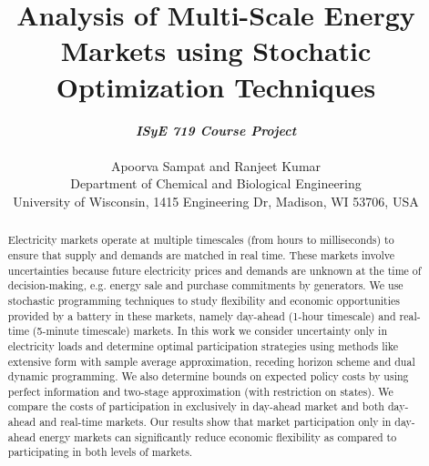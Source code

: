 \documentclass[11pt,twoside]{article}
\begin{document}
\title{Analysis of Multi-Scale Energy Markets using Stochatic Optimization Techniques}

\author{\textbf{\textit{ISyE 719 Course Project}}\\ \\Apoorva Sampat and Ranjeet Kumar\\
 {\small Department of Chemical and Biological Engineering}\\
 {\small \;University of Wisconsin, 1415 Engineering Dr, Madison, WI 53706, USA}}
\date{}
\maketitle

\begin{abstract}
Electricity markets operate at multiple timescales (from hours to milliseconds) to ensure that supply and demands are matched in real time. These markets involve uncertainties because future electricity prices and demands are unknown at the time of decision-making, e.g. energy sale and purchase commitments by generators. We use stochastic programming techniques to study flexibility and economic opportunities provided by a battery in these markets, namely day-ahead (1-hour timescale) and real-time (5-minute timescale) markets. In this work we consider uncertainty only in electricity loads and determine optimal participation strategies using methods like extensive form with sample average approximation, receding horizon scheme and dual dynamic programming. We also determine bounds on expected policy costs by using perfect information and two-stage approximation (with restriction on states). We compare the costs of participation in exclusively in day-ahead market and both day-ahead and real-time markets. Our results show that market participation only in day-ahead energy markets can significantly reduce economic flexibility as compared to participating in both levels of markets.
\end{abstract}
\end{document}
